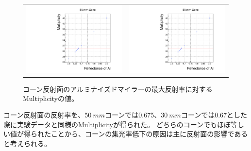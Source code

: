 \begin{figure}
  \begin{tabular}{cc}
    \begin{minipage}{0.45\hsize}
      \centering
      \includegraphics[keepaspectratio, scale=0.35, page=1]{images/chapter4/decideAl.pdf}
    \end{minipage} &
    \begin{minipage}{0.45\hsize}
      \centering
      \includegraphics[keepaspectratio, scale=0.35, page=2]{images/chapter4/decideAl.pdf}
    \end{minipage}
  \end{tabular}
  \caption{コーン反射面のアルミナイズドマイラーの最大反射率に対するMultiplicityの値。}
  \label{fig:decideAl}
\end{figure}

コーン反射面の反射率を、$\SI{50}{mm}$コーンでは0.675、$\SI{30}{mm}$コーンでは0.67とした際に実験データと同様のMultiplicityが得られた。
どちらのコーンでもほぼ等しい値が得られたことから、コーンの集光率低下の原因は主に反射面の影響であると考えられる。